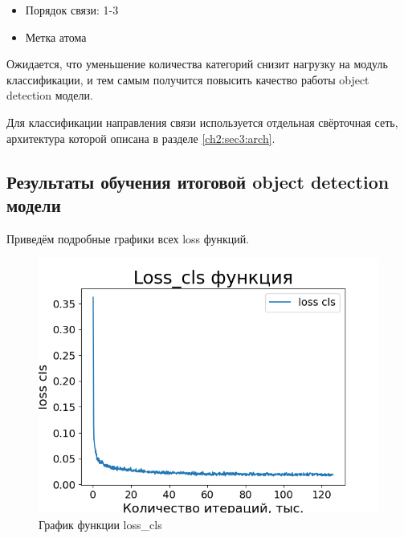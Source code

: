 \begin{itemize}
	\item Порядок связи: 1-3
	\item Метка атома
\end{itemize}

Ожидается, что уменьшение количества категорий снизит нагрузку на модуль классификации, и тем самым получится повысить качество работы object detection модели.

Для классификации направления связи используется отдельная свёрточная сеть, архитектура которой описана в разделе \ref{ch2:sec3:arch}.


\subsection{Результаты обучения итоговой object detection модели}

Приведём подробные графики всех loss функций.

\begin{figure}[ht!] 
	\center
	\includegraphics [scale=0.8] {my_folder/images/loss_cls_second}
	\caption{График функции loss\_cls}
	\label{fig:loss_cls}
\end{figure}

